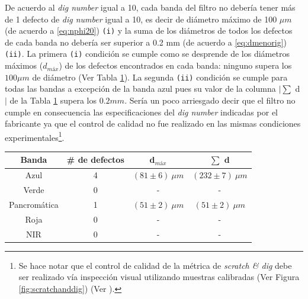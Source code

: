 De acuerdo al \textit{dig number} igual a 10, cada banda del filtro no debería tener más de 1 defecto de \textit{dig number} igual a 10, es decir de diámetro máximo de 100 $\mu m$  (de acuerdo a \ref{eq:nphi20}) \texttt{(i)} y la suma de los diámetros de todos los defectos de cada banda no debería ser superior a 0.2 mm (de acuerdo a \ref{eq:dmenorig}) \texttt{(ii)}. La primera \texttt{(i)} condición se cumple como se desprende de los diámetros máximos ($d_{máx}$) de los defectos encontrados en cada banda: ninguno supera los $100 \mu m$ de diámetro (Ver Tabla \ref{tabress}). La segunda \texttt{(ii)} condición se cumple para todas las bandas a excepción de la banda azul pues su valor de la columna $|\sum$ d $|$ de la Tabla \ref{tabress} supera los $0.2 mm$. Sería un poco arriesgado decir que el filtro no cumple en consecuencia las especificaciones del \textit{dig number}  indicadas por el fabricante ya que el control de calidad no fue realizado en las mismas condiciones experimentales\footnote{Se hace notar que el control de calidad de la métrica de \textit{scratch \& dig} debe ser realizado vía inspección visual utilizando muestras calibradas (Ver Figura \ref{fig:scratchanddig}) (Ver \cite{smm}).}.
 \begin{table}[H]
\begin{center}
\begin{tabular}{ |c|c|c|c| }    \toprule
Banda & \# de defectos & d$_{máx}$ & $\sum$ d\\\midrule
\rowcolor{blue!15} Azul    & 4 & $(81 \pm 6)~\mu m$ & $(232 \pm 7)~\mu m$   \\ 
\rowcolor{green!50} Verde  & 0 & - & - \\ 
Pancromática& 1 & $(51 \pm 2)~\mu m$ & $(51 \pm 2)~\mu m$  \\
\rowcolor{red!50} Roja & 0 & -  & -  \\
\rowcolor{maroon!20} NIR & 0 & -  & - \\
\bottomrule
 \hline
\end{tabular}
\end{center}
 \label{tabress}
 \end{table}
